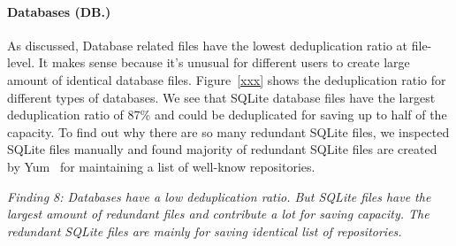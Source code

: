 
\paragraph{Databases (DB.)}

As discussed, Database related files have the lowest deduplication ratio at file-level. It makes sense because it's unusual for different users to create large amount of identical database files. Figure~\ref{xxx} shows the deduplication ratio for different types of databases. We see that SQLite database files have the largest deduplication ratio of 87\% and could be deduplicated for saving up to half of the capacity. To find out why there are so many redundant SQLite files, we inspected SQLite files manually and found majority of redundant SQLite files are created by Yum~\cite{xxx} for maintaining a list of well-know repositories.

\textit{Finding 8: Databases have a low deduplication ratio. But SQLite files have the largest amount of redundant files and contribute a lot for saving capacity. The redundant SQLite files are mainly for saving identical list of repositories.}


%



